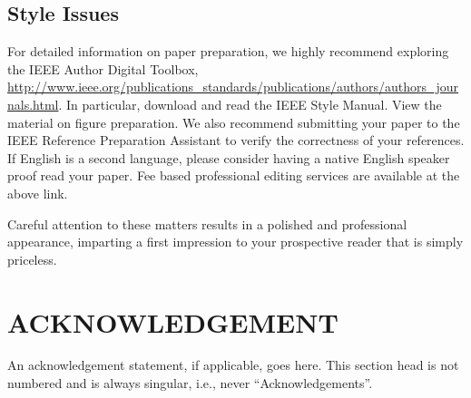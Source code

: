 \documentclass[]{NRSMRev}
\begin{document}
\subsection{Style Issues}
For detailed information on paper preparation, we highly recommend exploring the IEEE Author Digital Toolbox,
\url{http://www.ieee.org/publications_standards/publications/authors/authors_journals.html}. In particular, download and read the
IEEE Style Manual. View the material on figure preparation. We also recommend submitting your paper to the IEEE
Reference Preparation Assistant to verify the correctness of your references. If English is a second language, please
consider having a native English speaker proof read your paper. Fee based professional editing services are available at the
above link.

Careful attention to these matters results in a polished and professional appearance, imparting a first impression to your
prospective reader that is simply priceless.

\section*{ACKNOWLEDGEMENT}
An acknowledgement statement, if applicable, goes here. This section head is not numbered and is always singular, i.e., never ``Acknowledgements''.


%
%

\end{document}
